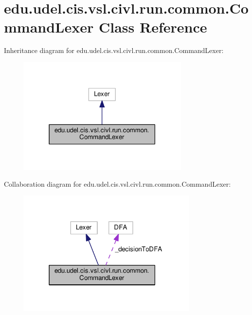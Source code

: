 \hypertarget{classedu_1_1udel_1_1cis_1_1vsl_1_1civl_1_1run_1_1common_1_1CommandLexer}{}\section{edu.\+udel.\+cis.\+vsl.\+civl.\+run.\+common.\+Command\+Lexer Class Reference}
\label{classedu_1_1udel_1_1cis_1_1vsl_1_1civl_1_1run_1_1common_1_1CommandLexer}


Inheritance diagram for edu.\+udel.\+cis.\+vsl.\+civl.\+run.\+common.\+Command\+Lexer\+:
\nopagebreak
\begin{figure}[H]
\begin{center}
\leavevmode
\includegraphics[width=243pt]{classedu_1_1udel_1_1cis_1_1vsl_1_1civl_1_1run_1_1common_1_1CommandLexer__inherit__graph}
\end{center}
\end{figure}


Collaboration diagram for edu.\+udel.\+cis.\+vsl.\+civl.\+run.\+common.\+Command\+Lexer\+:
\nopagebreak
\begin{figure}[H]
\begin{center}
\leavevmode
\includegraphics[width=255pt]{classedu_1_1udel_1_1cis_1_1vsl_1_1civl_1_1run_1_1common_1_1CommandLexer__coll__graph}
\end{center}
\end{figure}
